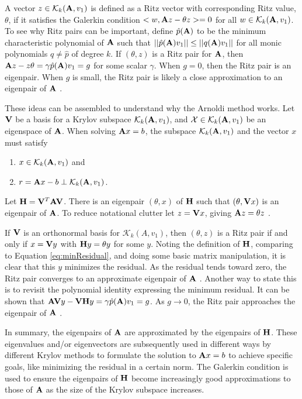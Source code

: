 A vector $z \in \mathcal{K}_{k}(\mathbf{A},v_{1})$ is defined as a Ritz vector with corresponding Ritz value, $\theta$, if it satisfies the Galerkin condition $<w, \mathbf{A}z - \theta z> = 0 $ for all $w \in \mathcal{K}_{k}(\mathbf{A}, v_{1})$. To see why Ritz pairs can be important, define $\hat{p}(\mathbf{A})$ to be the minimum characteristic polynomial of $\mathbf{A}$ such that $||\hat{p}(\mathbf{A})v_{1}|| \le ||q(\mathbf{A})v_{1}||$ for all monic polynomials $q \ne \hat{p}$ of degree $k$. If $(\theta, z)$ is a Ritz pair for $\mathbf{A}$, then $\mathbf{A}z - z\theta = \gamma \hat{p}(\mathbf{A})v_{1} = g$ for some scalar $\gamma$. When $g = 0$, then the Ritz pair is an eigenpair. When $g$ is small, the Ritz pair is likely a close approximation to an eigenpair of $\mathbf{A}$ \cite{Sorensen1996}. 

These ideas can be assembled to understand why the Arnoldi method works. Let $\mathbf{V}$ be a basis for a Krylov subspace $\mathcal{K}_{k}(\mathbf{A},v_{1})$, and $\mathcal{X} \in \mathcal{K}_{k}(\mathbf{A},v_{1})$ be an eigenspace of $\mathbf{A}$. When solving $\mathbf{A}x = b$, the subspace $\mathcal{K}_{k}(\mathbf{A},v_{1})$ and the vector $x$ must satisfy
\begin{enumerate}
  \item $x \in \mathcal{K}_{k}(\mathbf{A},v_{1})$ and
  \item $r = \mathbf{A}x - b \perp \mathcal{K}_{k}(\mathbf{A},v_{1})$. 
\end{enumerate} 
%
Let $\mathbf{H} = \mathbf{V}^{T}\mathbf{AV}$. There is an eigenpair $(\theta, x)$ of $\mathbf{H}$ such that $(\theta, \mathbf{V}x)$ is an eigenpair of $\mathbf{A}$. To reduce notational clutter let $z = \mathbf{V}x$, giving $\mathbf{A}z = \theta z$ \cite{Stewart2001}. 

If $\mathbf{V}$ is an orthonormal basis for  $\mathcal{K}_{k}(A,v_{1})$, then $(\theta, z)$ is a Ritz pair if and only if $x = \mathbf{V}y$ with $\mathbf{H}y = \theta y$ for some $y$. Noting the definition of $\mathbf{H}$, comparing to Equation \eqref{eq:minResidual}, and doing some basic matrix manipulation, it is clear that this $y$ minimizes the residual. As the residual tends toward zero, the Ritz pair converges to an approximate eigenpair of $\mathbf{A}$ \cite{Stewart2001}. Another way to state this is to revisit the polynomial identity expressing the minimum residual. It can be shown that $\mathbf{AV}y - \mathbf{VH}y = \gamma \hat{p}(\mathbf{A})v_{1} = g$. As $g \to 0$, the Ritz pair approaches the eigenpair of $\mathbf{A}$ \cite{Sorensen1996}. 

In summary, the eigenpairs of $\mathbf{A}$ are approximated by the eigenpairs of $\mathbf{H}$. These eigenvalues and/or eigenvectors are subsequently used in different ways by different Krylov methods to formulate the solution to $\mathbf{A}x = b$ to achieve specific goals, like minimizing the residual in a certain norm. The Galerkin condition is used to ensure the eigenpairs of $\mathbf{H}$ become increasingly good approximations to those of $\mathbf{A}$ as the size of the Krylov subspace increases. 

